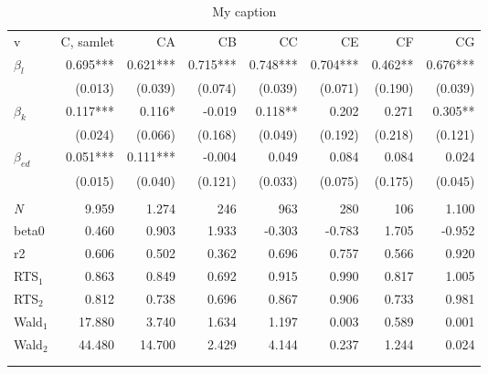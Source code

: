 \begin{table}[tb]
\centering
\caption{My caption}
\label{my-label}
\begin{tabular}{@{}lrrrrrrr@{}}\arrayrulecolor{MidnightBlue}\toprule
v             & C, samlet & CA       & CB       & CC       & CE       & CF      & CG       \\ \arrayrulecolor{MidnightBlue}\midrule
$\beta_l$      & 0.695***  & 0.621*** & 0.715*** & 0.748*** & 0.704*** & 0.462** & 0.676*** \\
              & (0.013)   & (0.039)  & (0.074)  & (0.039)  & (0.071)  & (0.190) & (0.039)  \\
$\beta_k$      & 0.117***  & 0.116*   & -0.019   & 0.118**  & 0.202    & 0.271   & 0.305**  \\
              & (0.024)   & (0.066)  & (0.168)  & (0.049)  & (0.192)  & (0.218) & (0.121)  \\
$\beta_{ed}$ & 0.051***  & 0.111*** & -0.004   & 0.049    & 0.084    & 0.084   & 0.024    \\
              & (0.015)   & (0.040)  & (0.121)  & (0.033)  & (0.075)  & (0.175) & (0.045)  \\
              &           &          &          &          &          &         &          \\
\emph{N}  & 9.959     & 1.274    & 246      & 963      & 280      & 106     & 1.100    \\
beta0         & 0.460     & 0.903    & 1.933    & -0.303   & -0.783   & 1.705   & -0.952   \\
r2            & 0.606     & 0.502    & 0.362    & 0.696    & 0.757    & 0.566   & 0.920    \\
RTS$_1$          & 0.863     & 0.849    & 0.692    & 0.915    & 0.990    & 0.817   & 1.005    \\
RTS$_2$           & 0.812     & 0.738    & 0.696    & 0.867    & 0.906    & 0.733   & 0.981    \\
Wald$_1$         & 17.880    & 3.740    & 1.634    & 1.197    & 0.003    & 0.589   & 0.001    \\
Wald$_2$         & 44.480    & 14.700   & 2.429    & 4.144    & 0.237    & 1.244   & 0.024   \\ \arrayrulecolor{MidnightBlue}\midrule
\multicolumn{8}{l}{Standardfejl i parantes. Kilde: Danmarks Statistik og egne beregninger.} \\
\arrayrulecolor{MidnightBlue}\bottomrule
\end{tabular}
\end{table}